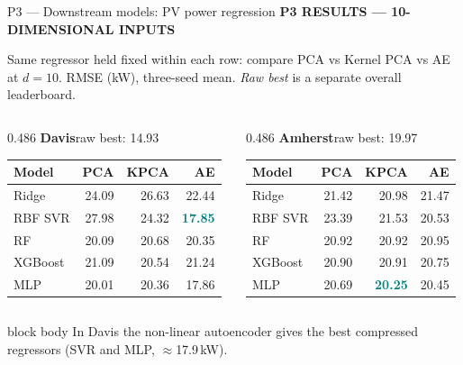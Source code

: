 \documentclass[aspectratio=169,11pt]{beamer}
\newcommand{\sectiontag}[1]{{\footnotesize\usebeamercolor[fg]{structure}\textbf{#1}}\par\vspace{0.10cm}}
\newcommand{\smallmuted}[1]{{\footnotesize\color{slate}#1\par}}
\begin{document}
\begin{frame}{P3 — Downstream models: PV power regression}
\sectiontag{P3 \quad RESULTS — 10-DIMENSIONAL INPUTS}
\smallmuted{Same regressor held fixed within each row: compare PCA vs Kernel PCA vs AE at $d=10$. RMSE (kW), three-seed mean. \emph{Raw best} is a separate overall leaderboard.}\vspace{0.18cm}
\begin{columns}[T,onlytextwidth]
\begin{column}{0.486\textwidth}
\textbf{Davis}\hfill{\scriptsize raw best: 14.93}\par\vspace{0.12cm}
{\fontsize{8.8}{10.4}\selectfont
\setlength{\tabcolsep}{3.9pt}
\renewcommand{\arraystretch}{1.39}
\begin{tabular}{@{}lrrr@{}}\toprule
\textbf{Model} & \textbf{PCA} & \textbf{KPCA} & \textbf{AE}\\\midrule
Ridge & 24.09 & 26.63 & 22.44\\
RBF SVR & 27.98 & 24.32 & \textcolor{teal}{\textbf{17.85}}\\
RF & 20.09 & 20.68 & 20.35\\
XGBoost & 21.09 & 20.54 & 21.24\\
MLP & 20.01 & 20.36 & 17.86\\
\bottomrule\end{tabular}}
\end{column}
\begin{column}{0.486\textwidth}
\textbf{Amherst}\hfill{\scriptsize raw best: 19.97}\par\vspace{0.12cm}
{\fontsize{8.8}{10.4}\selectfont
\setlength{\tabcolsep}{3.9pt}
\renewcommand{\arraystretch}{1.39}
\begin{tabular}{@{}lrrr@{}}\toprule
\textbf{Model} & \textbf{PCA} & \textbf{KPCA} & \textbf{AE}\\\midrule
Ridge & 21.42 & 20.98 & 21.47\\
RBF SVR & 23.39 & 21.53 & 20.53\\
RF & 20.92 & 20.92 & 20.95\\
XGBoost & 20.90 & 20.91 & 20.75\\
MLP & 20.69 & \textcolor{teal}{\textbf{20.25}} & 20.45\\
\bottomrule\end{tabular}}
\end{column}
\end{columns}
\vspace{0.30cm}
\begin{beamercolorbox}[wd=\linewidth,sep=0.14cm]{block body}
\footnotesize In Davis the non-linear autoencoder gives the best compressed regressors (SVR and MLP, $\approx$17.9\,kW).
\end{beamercolorbox}
\end{frame}
\end{document}

